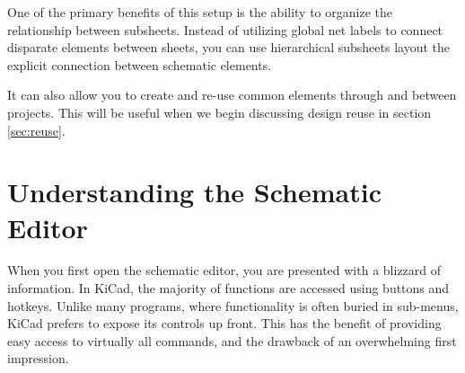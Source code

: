 One of the primary benefits of this setup is the ability to organize the relationship between subsheets.
Instead of utilizing global net labels to connect disparate elements between sheets, you can use hierarchical subsheets layout the explicit connection between schematic elements.

It can also allow you to create and re-use common elements through and between projects.
This will be useful when we begin discussing design reuse in section \ref{sec:reuse}.



\section{Understanding the Schematic Editor}

When you first open the schematic editor, you are presented with a blizzard of information.
In KiCad, the majority of functions are accessed using buttons and hotkeys.
Unlike many programs, where functionality is often buried in sub-menus, KiCad prefers to expose its controls up front.
This has the benefit of providing easy access to virtually all commands, and the drawback of an overwhelming first impression.

